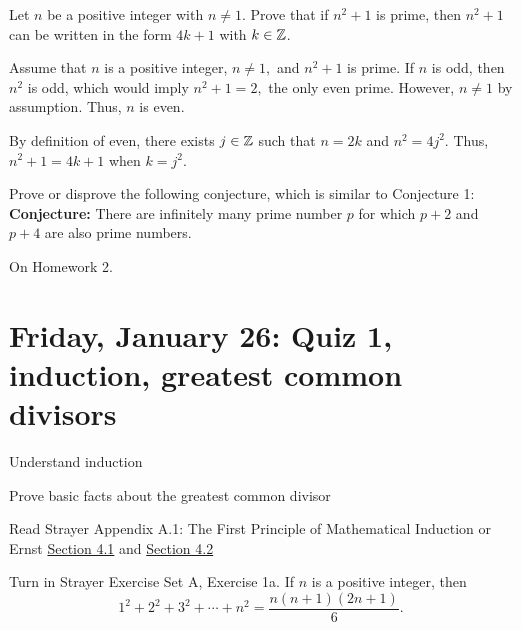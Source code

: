 \documentclass{ximera}
\begin{document}
  \begin{br} Let $n$ be a positive integer with $n\neq 1$. Prove that if $n^2+1$ is prime, then $n^2+1$ can be written in the form $4k+1$ with $k\in\mathbb Z$.
  \begin{solution}
   Assume that $n$ is a positive integer, $n\neq 1,$ and $n^2+1$ is prime. If $n$ is odd, then $n^2$ is odd, which would imply $n^2+1=2,$ the only even prime. However, $n\neq 1$ by assumption. Thus, $n$ is even. 

    By definition of even, there exists $j\in\mathbb Z$ such that $n=2k$ and $n^2=4j^2$. Thus, $n^2+1=4k+1$ when $k=j^2.$
  \end{solution}
\end{br}

  \begin{br}
  Prove or disprove the following conjecture, which is similar to Conjecture 1:\\
      \textbf{Conjecture:} There are infinitely many prime number $p$ for which $p+2$ and $p+4$ are also prime numbers.

  
  \begin{solution}
    On Homework 2.
  \end{solution}
    \end{br}



\section{Friday, January 26: Quiz 1, induction, greatest common divisors}

\begin{obj}
\item  Understand induction
\item Prove basic facts about the greatest common divisor
\end{obj}

\begin{pre}
 \item[Read] Strayer Appendix A.1: The First Principle of Mathematical Induction  or Ernst \href{https://danaernst.com/IBL-IntroToProof/pretext/sec_Intro_to_Induction.html}{Section 4.1} and \href{https://danaernst.com/IBL-IntroToProof/pretext/sec_More_on_Induction.html}{Section 4.2}
 
 \item[Turn in] Strayer Exercise Set A, Exercise 1a. If $n$ is a positive integer, then 
 \[1^2+2^2+3^2+\cdots+n^2=\frac{n(n+1)(2n+1)}{6}.\]

\end{pre}
\end{document}
